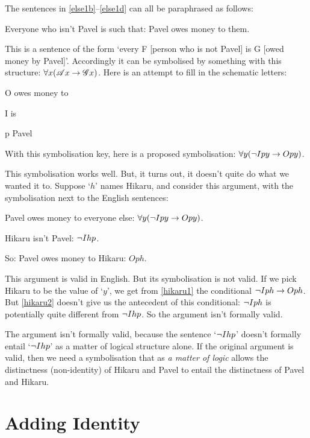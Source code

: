 The sentences in \ref{else1b}–\ref{else1d} can all be paraphrased as follows:
\begin{earg}
	\item[\ex{else1e}] Everyone who isn't Pavel is such that: Pavel owes money to them.
\end{earg} This is a sentence of the form `every F [person who is not Pavel] is G [owed money by Pavel]'. Accordingly it can be symbolised by something with this structure: $\forall x (\mathscr{A}x \rightarrow \mathscr{G}x)$. Here is an attempt to fill in the schematic letters:
	\begin{ekey}
		\item[O]  owes money to 
		\item[I]  is 
		\item[p] Pavel
	\end{ekey}
With this symbolisation  key, here is a proposed symbolisation: $\forall y (\neg Ipy \rightarrow Opy)$. 

This symbolisation works well. But, it turns out, it doesn't quite do what we wanted it to. Suppose `$h$' names Hikaru, and consider this argument, with the symbolisation next to the English sentences:
\begin{earg}
	\item[\ex{hikaru1}] Pavel owes money to everyone else: $\forall y (\neg Ipy \rightarrow Opy)$.
	\item[\ex{hikaru2}] Hikaru isn't Pavel: $\neg Ihp$.
	\item[So:] Pavel owes money to Hikaru: $Oph$.
\end{earg}This argument is valid in English. But its symbolisation is not valid. If we pick Hikaru to be the value of `$y$', we get from \ref{hikaru1} the conditional $\neg Iph \rightarrow Oph$. But \ref{hikaru2} doesn't give us the antecedent of this conditional: $\neg Iph$ is potentially quite different from $\neg Ihp$. So the argument isn't formally valid.

The argument isn't formally valid, because the sentence `$\neg Ihp$' doesn't formally entail `$\neg Ihp$' as a matter of logical structure alone. If the original argument is valid, then we need a symbolisation that as \emph{a matter of logic} allows the distinctness (non-identity) of Hikaru and Pavel to entail the distinctness of Pavel and Hikaru.  

\section{Adding Identity}

